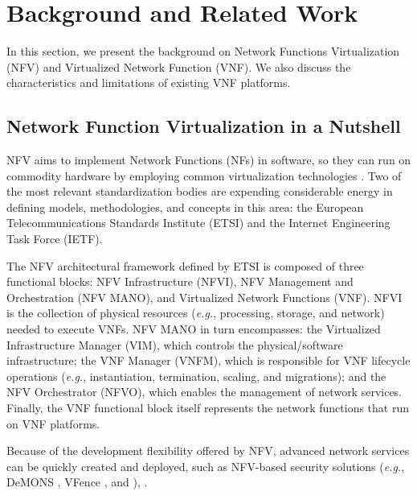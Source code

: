 \section{Background and Related Work} \label{BACK}

In this section, we present the background on Network Functions Virtualization (NFV) and Virtualized Network Function (VNF). We also discuss the characteristics and limitations of existing VNF platforms.

\subsection{Network Function Virtualization in a Nutshell} \label{VISAO}

NFV aims to implement Network Functions (NFs) in software, so they can run on commodity hardware by employing common virtualization technologies \cite{ETSI-2012}. Two of the most relevant standardization bodies are expending considerable energy in defining models, methodologies, and concepts in this area: the European Telecommunications Standards Institute (ETSI) and the Internet Engineering Task Force (IETF).

The NFV architectural framework \cite{GS-2014} defined by ETSI is composed of three functional blocks: NFV Infrastructure (NFVI), NFV Management and Orchestration (NFV MANO), and Virtualized Network Functions (VNF). NFVI is the collection of physical resources (\textit{e.g.}, processing, storage, and network) needed to execute VNFs. NFV MANO in turn encompasses: the Virtualized Infrastructure Manager (VIM), which controls the physical/software infrastructure; the VNF Manager (VNFM), which is responsible for VNF lifecycle operations (\textit{e.g.}, instantiation, termination, scaling, and migrations); and the NFV Orchestrator (NFVO), which enables the management of network services. Finally, the VNF functional block itself represents the network functions that run on VNF platforms.

Because of the development flexibility offered by NFV, advanced network services can be quickly created and deployed, such as NFV-based security solutions (\textit{e.g.}, DeMONS \cite{Garcia-2018}, VFence \cite{Jakaria-2016}, and \cite{Cunha-2018}), .


